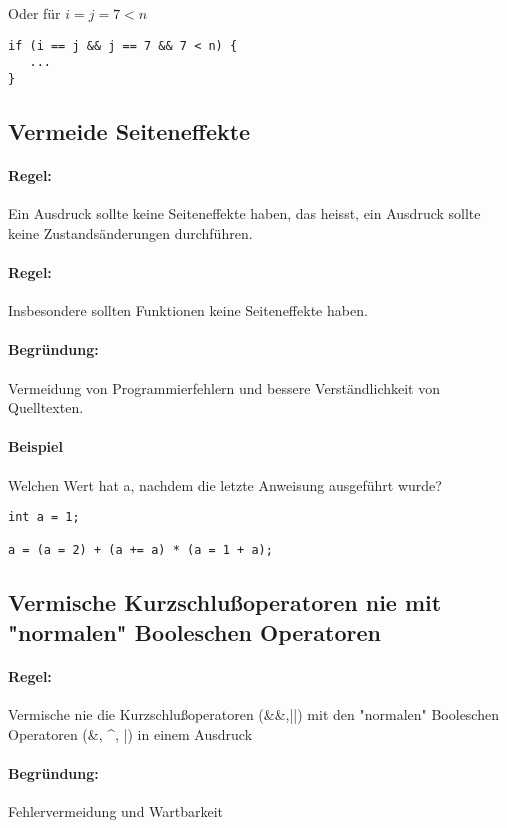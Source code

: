Oder für $i = j = 7 < n$

\begin{lstlisting}
if (i == j && j == 7 && 7 < n) {
   ...
}
\end{lstlisting}

\subsection{Vermeide Seiteneffekte}

\paragraph{Regel:} Ein Ausdruck sollte keine Seiteneffekte haben, das heisst, ein Ausdruck sollte keine Zustandsänderungen durchführen.
\paragraph{Regel:} Insbesondere sollten Funktionen keine Seiteneffekte haben.
\paragraph{Begründung:} Vermeidung von Programmierfehlern und bessere Verständlichkeit von Quelltexten.

\paragraph{Beispiel} Welchen Wert hat a, nachdem die letzte Anweisung ausgeführt wurde? \par
\begin{lstlisting}
int a = 1;

a = (a = 2) + (a += a) * (a = 1 + a);
\end{lstlisting}

\subsection{Vermische Kurzschlußoperatoren nie mit "normalen" Booleschen Operatoren}

\paragraph{Regel:} Vermische nie die Kurzschlußoperatoren (\&\&,||) mit den "normalen" Booleschen Operatoren (\&, \string^, |) in einem Ausdruck
\paragraph{Begründung:} Fehlervermeidung und Wartbarkeit

